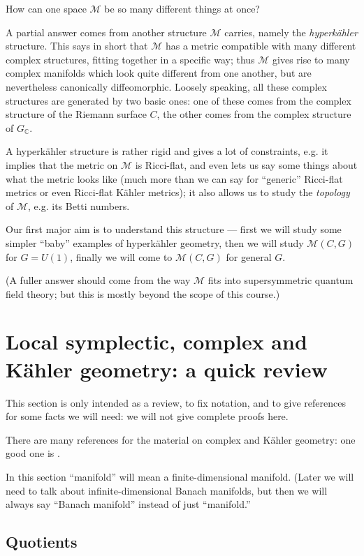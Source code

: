 \documentclass[12pt,letterpaper,reqno]{article}
\numberwithin{equation}{section}
\newcommand{\cM}{\ensuremath{\mathcal M}}
\newcommand{\C}{\ensuremath{\mathbb C}}
\newcommand{\kahler}{K\"ahler\xspace}
\newcommand{\hk}{hyperk\"ahler\xspace}
\newcommand{\ti}[1]{\textit{#1}}
\begin{document}
How can one space $\cM$ be so many different things at once?

A partial answer comes from another structure $\cM$ carries, namely
the \ti{\hk} structure. This says in short that $\cM$ has a 
metric compatible with many
different complex structures,
fitting together in a specific way; thus $\cM$ gives rise to
many complex manifolds which look quite different from one
another, but are nevertheless canonically diffeomorphic.
Loosely speaking, all these complex structures are generated 
by two basic ones: one of these comes from the complex structure
of the Riemann surface $C$, the other comes from the complex
structure of $G_\C$.

A \hk structure is rather rigid and gives a lot of constraints, e.g.
it implies that the metric on $\cM$ is Ricci-flat, and even lets 
us say some things about what the metric looks like (much
more than we can say for ``generic'' Ricci-flat metrics
or even Ricci-flat \kahler metrics);
it also allows us to study the \ti{topology} of $\cM$, e.g. 
its Betti numbers.

Our first major aim is to understand this structure --- first 
we will study some simpler ``baby'' examples of \hk geometry, then
we will study $\cM(C,G)$ for $G = U(1)$, finally we will
come to $\cM(C,G)$ for general $G$.

(A fuller answer should come from the way $\cM$
fits into supersymmetric quantum field theory; but this is 
mostly beyond the scope of this course.)


\section{Local symplectic, complex and \kahler geometry: a quick review}

This section is only intended as a review, to fix notation, and to
give references for some facts we will need: we will not give 
complete proofs here.

There are many references for the material on complex
and \kahler geometry: one
good one is \cite{MR2093043}.

In this section ``manifold'' will mean a finite-dimensional
manifold. (Later we will need to talk about 
infinite-dimensional Banach manifolds, but then we will 
always say ``Banach manifold'' instead of just ``manifold.''

\subsection{Quotients}
\end{document}
